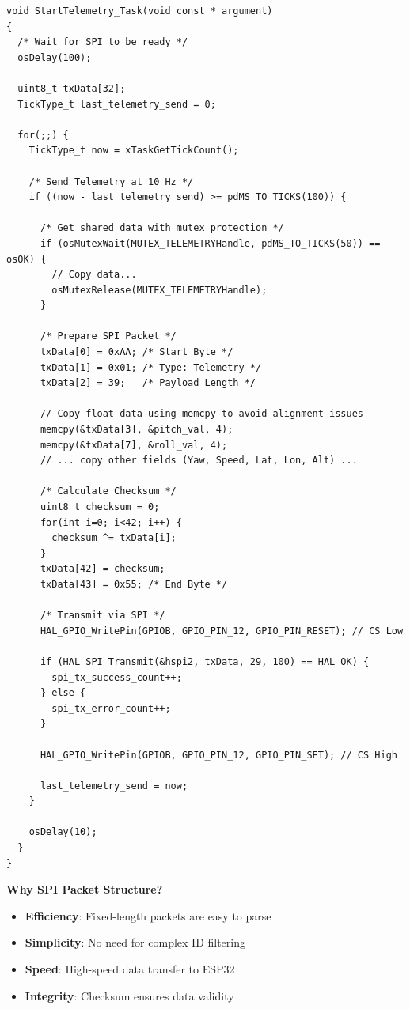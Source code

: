 \documentclass[11pt,a4paper]{article}
\begin{document}
\begin{lstlisting}[caption=Telemetry Task Implementation, label=lst:telmtask]
void StartTelemetry_Task(void const * argument)
{
  /* Wait for SPI to be ready */
  osDelay(100);
  
  uint8_t txData[32];
  TickType_t last_telemetry_send = 0;
  
  for(;;) {
    TickType_t now = xTaskGetTickCount();
    
    /* Send Telemetry at 10 Hz */
    if ((now - last_telemetry_send) >= pdMS_TO_TICKS(100)) {
      
      /* Get shared data with mutex protection */
      if (osMutexWait(MUTEX_TELEMETRYHandle, pdMS_TO_TICKS(50)) == osOK) {
        // Copy data...
        osMutexRelease(MUTEX_TELEMETRYHandle);
      }
      
      /* Prepare SPI Packet */
      txData[0] = 0xAA; /* Start Byte */
      txData[1] = 0x01; /* Type: Telemetry */
      txData[2] = 39;   /* Payload Length */
      
      // Copy float data using memcpy to avoid alignment issues
      memcpy(&txData[3], &pitch_val, 4);
      memcpy(&txData[7], &roll_val, 4);
      // ... copy other fields (Yaw, Speed, Lat, Lon, Alt) ...
      
      /* Calculate Checksum */
      uint8_t checksum = 0;
      for(int i=0; i<42; i++) {
        checksum ^= txData[i];
      }
      txData[42] = checksum;
      txData[43] = 0x55; /* End Byte */
      
      /* Transmit via SPI */
      HAL_GPIO_WritePin(GPIOB, GPIO_PIN_12, GPIO_PIN_RESET); // CS Low
      
      if (HAL_SPI_Transmit(&hspi2, txData, 29, 100) == HAL_OK) {
        spi_tx_success_count++;
      } else {
        spi_tx_error_count++;
      }
      
      HAL_GPIO_WritePin(GPIOB, GPIO_PIN_12, GPIO_PIN_SET); // CS High
      
      last_telemetry_send = now;
    }
    
    osDelay(10);
  }
}
\end{lstlisting}

\textbf{Why SPI Packet Structure?}
\begin{itemize}
    \item \textbf{Efficiency}: Fixed-length packets are easy to parse
    \item \textbf{Simplicity}: No need for complex ID filtering
    \item \textbf{Speed}: High-speed data transfer to ESP32
    \item \textbf{Integrity}: Checksum ensures data validity
\end{itemize}
\end{document}
